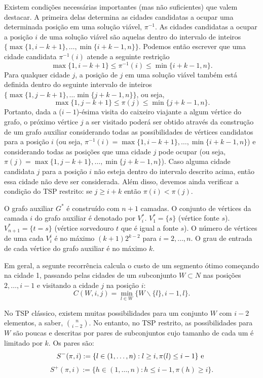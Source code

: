 \documentclass{article}
\begin{document}
Existem condições necessárias importantes (mas não suficientes) que valem destacar. A primeira delas determina as cidades candidatas a ocupar uma determinada posição em uma solução viável, $\pi^{-1}$. As cidades candidatas a ocupar a posição $i$ de uma solução viável são aquelas dentro do intervalo de inteiros $\{\max\{1, i - k + 1\}, \dots, \min\{i + k - 1, n\}\}$. Podemos então escrever que uma cidade candidata $\pi^{-1}(i)$ atende a seguinte restrição $$\max\{1, i-k+1\} \leq \pi^{-1}(i) \leq \min\{i+k-1,n\}.$$ Para qualquer cidade $j$, a posição de $j$ em uma solução viável também está definida dentro do seguinte intervalo de inteiros $\{\max\{1, j-k+1\}, \dots \min\{j + k -1,n\}\}$, ou seja, $$\max\{1, j-k+1\} \leq \pi(j) \leq \min\{j+k-1,n\}.$$ Portanto, dada a ($i-1$)-ésima visita do caixeiro viajante a algum vértice do grafo, o próximo vértice $j$ a ser visitado poderá ser obtido através da construção de um grafo auxiliar considerando todas as possibilidades de vértices candidatos para a posição $i$ (ou seja, $\pi^{-1}(i) = \max\{1, i-k+1\}, \dots, \min\{i+k-1,n\}$) e considerando todas as posições que uma cidade $j$ pode ocupar (ou seja, $\pi(j) = \max\{1, j-k+1\}, \dots, \min\{j+k-1,n\}$). Caso alguma cidade candidata $j$ para a posição $i$ não esteja dentro do intervalo descrito acima, então essa cidade não deve ser considerada. Além disso, devemos ainda verificar a condição do TSP restrito: se $j \geq i + k$ então $\pi(i) < \pi(j)$.

O grafo auxiliar $G^*$ é construído com $n+1$ camadas. O conjunto de vértices da camada $i$ do grafo auxiliar é denotado por $V^*_i$. $V^*_1 = \{s\}$ (vértice fonte $s$). $V^*_{n+1} = \{t=s\}$ (vértice sorvedouro $t$ que é igual a fonte $s$). O número de vértices de uma cada $V^i_i$ é no máximo $(k+1)2^{k-2}$ para $i=2, \dots, n$. O grau de entrada de cada vértice do grafo auxiliar é no máximo $k$.

Em geral, a segunte recorrência calcula o custo de um segmento ótimo começando na cidade 1, passando pelas cidades de um subconjunto $W\subset N$ nas posições $2, \dots, i-1$ e visitando a cidade $j$ na posição $i$: $$C(W,i,j) = \min_{l\in W}\{W \backslash \{l\}, i-1, l\}.$$

No TSP clássico, existem muitas possibilidades para um conjunto $W$ com $i-2$ elementos, a saber, $\binom {n}{i-2}$. No entanto, no TSP restrito, as possibilidades para $W$ são poucas e descritas por pares de subconjuntos cujo tamanho de cada um é limitado por $k$. Os pares são:
$$ S^-(\pi, i):= \{l \in (1, \dots, n): l \geq i, \pi(l) \leq i-1\} \textmd{ e }$$
$$ S^+(\pi, i):= \{h \in (1, \dots, n): h \leq i-1, \pi(h) \geq i\}.$$
\end{document}
